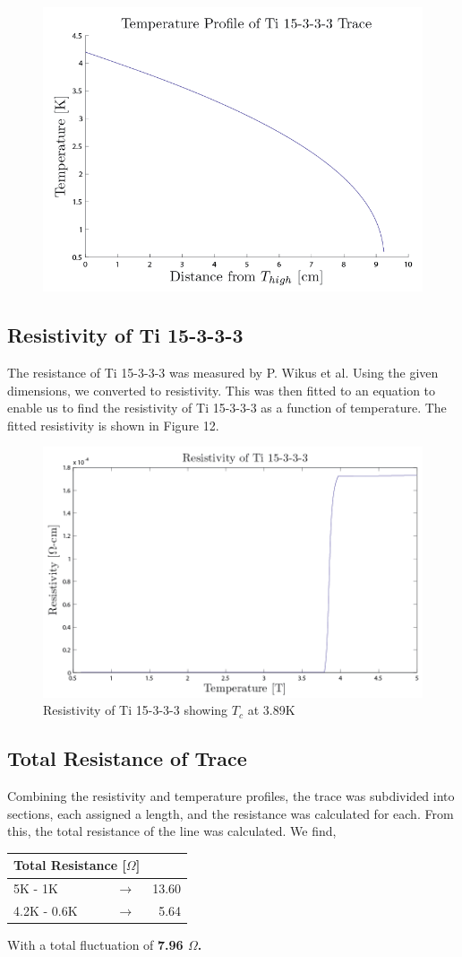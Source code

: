 \documentclass{article}
\begin{document}
\begin{figure}[h]
\centering
\includegraphics[width = .5\textwidth]{Ti153_T_Profile.png}
\caption{}
\end{figure}

\subsection{Resistivity of Ti 15-3-3-3}
The resistance of Ti 15-3-3-3 was measured by P. Wikus et al. Using the given dimensions, we converted to resistivity. This was then fitted to an equation to enable us to find the resistivity of Ti 15-3-3-3 as a function of temperature. The fitted resistivity is shown in Figure 12.

\begin{figure}[h]
\centering
\includegraphics[width = .6\textwidth]{Ti_Resistivity.png}
\caption{Resistivity of Ti 15-3-3-3 showing $T_c$ at 3.89K}
\end{figure}

\subsection{Total Resistance of Trace}

Combining the resistivity and temperature profiles, the trace was subdivided into sections, each assigned a length, and the resistance was calculated for each. From this, the total resistance of the line was calculated. We find,

\begin{table}[h]
\begin{threeparttable}
\begin{tabular}{lcr}
\toprule
\multicolumn{2}{r}{Total Resistance [$\Omega$]} \\
\midrule
5K - 1K & $\rightarrow$ & 13.60 \\
4.2K - 0.6K & $\rightarrow$ & 5.64 \\
\bottomrule
\end{tabular}
\end{threeparttable}
\end{table}

\noindent With a total fluctuation of \bf{7.96 $\Omega$}.


\restoregeometry
\newpage

\end{document}
